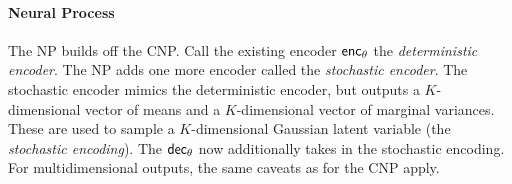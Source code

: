 \documentclass[12pt]{report}
\newcommand{\xrprefix}[1]{xr-#1}
\begin{document}

\paragraph{Neural Process \parencite[NP;][]{Garnelo:2018:Neural_Processes}}
The NP builds off the CNP.
Call the existing encoder $\mathsf{enc}_\theta$ the \emph{deterministic encoder}.
The NP adds one more encoder called the \emph{stochastic encoder}.
The stochastic encoder mimics the deterministic encoder, but outputs a $K$-dimensional vector of means and a $K$-dimensional vector of marginal variances.
These are used to sample a $K$-dimensional Gaussian latent variable (the \emph{stochastic encoding}).
The $\mathsf{dec}_\theta$ now additionally takes in the stochastic encoding.
For multidimensional outputs, the same caveats as for the CNP apply.
\end{document}
